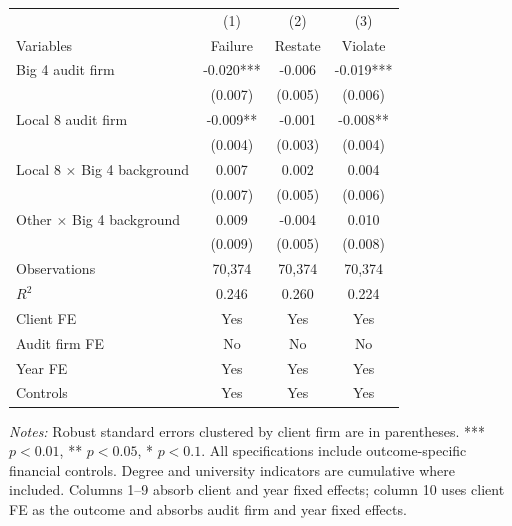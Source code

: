 \documentclass[10pt]{article}
\begin{document}
\begin{minipage}{19cm}\fontsize{10}{12}\selectfont\setlength{\tabcolsep}{4pt}\renewcommand{\arraystretch}{1.12}


\centering
{}
\begin{threeparttable}
\begin{tabular}{p{}ccc}
\toprule
 & (1) & (2) & (3) \\
Variables & Failure & Restate & Violate \\
\midrule
Big 4 audit firm & -0.020*** & -0.006 & -0.019*** \\
 & (0.007) & (0.005) & (0.006) \\
Local 8 audit firm & -0.009** & -0.001 & -0.008** \\
 & (0.004) & (0.003) & (0.004) \\
Local 8 $\times$ Big 4 background & 0.007 & 0.002 & 0.004 \\
 & (0.007) & (0.005) & (0.006) \\
Other $\times$ Big 4 background & 0.009 & -0.004 & 0.010 \\
 & (0.009) & (0.005) & (0.008) \\
Observations & 70,374 & 70,374 & 70,374 \\
$R^{2}$ & 0.246 & 0.260 & 0.224 \\
Client FE & Yes & Yes & Yes \\
Audit firm FE & No & No & No \\
Year FE & Yes & Yes & Yes \\
Controls & Yes & Yes & Yes \\
\bottomrule
\end{tabular}
\begin{tablenotes}\fontsize{9}{11}\selectfont
\item \raggedright \fontsize{9}{11}\selectfont \textit{Notes:} Robust standard errors clustered by client firm are in parentheses. *** $p<0.01$, ** $p<0.05$, * $p<0.1$. All specifications include outcome-specific financial controls. Degree and university indicators are cumulative where included.
Columns 1--9 absorb client and year fixed effects; column 10 uses client FE as the outcome and absorbs audit firm and year fixed effects.
\end{tablenotes}
\end{threeparttable}

\end{minipage}
\end{document}
